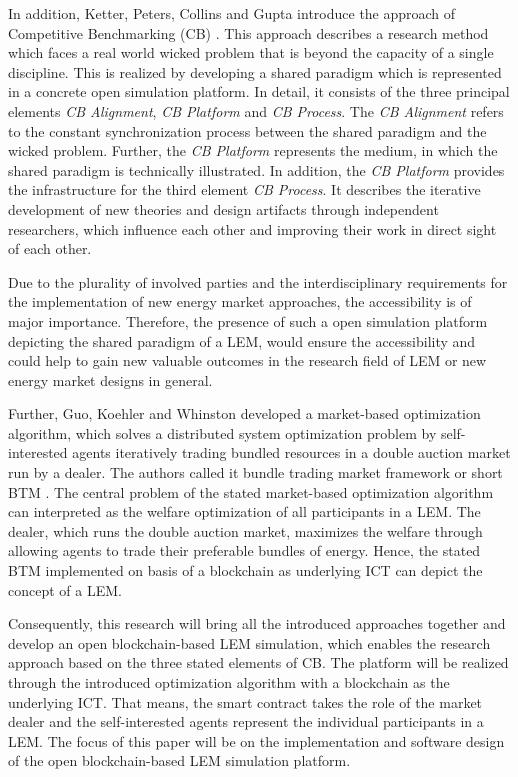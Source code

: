 In addition, Ketter, Peters, Collins and Gupta introduce the approach of Competitive Benchmarking (CB) \cite{ketter2015competitive}. This approach describes a research method which faces a real world wicked problem that is beyond the capacity of a single discipline. This is realized by developing a shared paradigm which is represented in a concrete open simulation platform. In detail, it consists of the three principal elements \textit{CB Alignment}, \textit{CB Platform} and \textit{CB Process}. The \textit{CB Alignment} refers to the constant synchronization process between the shared paradigm and the wicked problem. Further, the \textit{CB Platform} represents the medium, in which the shared paradigm is technically illustrated. In addition, the \textit{CB Platform} provides the infrastructure for the third element \textit{CB Process}. It describes the iterative development of new theories and design artifacts through independent researchers, which influence each other and improving their work in direct sight of each other. 

Due to the plurality of involved parties and the interdisciplinary requirements for the implementation of new energy market approaches, the accessibility is of major importance.
Therefore, the presence of such a open simulation platform depicting the shared paradigm of a LEM, would ensure the accessibility and could help to gain new valuable outcomes in the research field of LEM or new energy market designs in general. 

Further, Guo, Koehler and Whinston developed a market-based optimization algorithm, which solves a distributed system optimization problem by self-interested agents iteratively trading bundled resources in a double auction market run by a dealer. The authors called it bundle trading market framework or short BTM \cite{guo2007market}. The central problem of the stated market-based optimization algorithm can interpreted as the welfare optimization of all participants in a LEM. The dealer, which runs the double auction market, maximizes the welfare through allowing agents to trade their preferable bundles of energy. Hence, the stated BTM implemented on basis of a blockchain as underlying ICT can depict the concept of a LEM.

Consequently, this research will bring all the introduced approaches together and develop an open blockchain-based LEM simulation, which enables the research approach based on the three stated elements of CB. The platform will be realized through the introduced optimization algorithm with a blockchain as the underlying ICT. That means, the smart contract takes the role of the market dealer and the self-interested agents represent the individual participants in a LEM. The focus of this paper will be on the implementation and software design of the open blockchain-based LEM simulation platform.

 